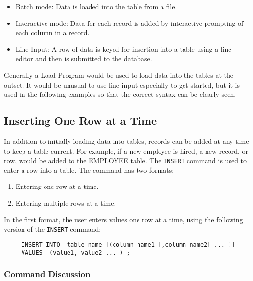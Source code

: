 \begin{itemize}
\item Batch mode: Data is loaded into the table from a file.

\item Interactive mode: Data for each record is added by interactive
prompting of each column in a record.

\item Line Input:  A row of data is keyed for insertion into a table
using a line editor and then is submitted to the database.
\end{itemize}

Generally a Load Program would be used to load data into the tables at
the outset.  It would be unusual to use line input especially to get
started, but it is used in the following examples so that the correct
syntax can be clearly seen.

\subsection{Inserting One Row at a Time}

In addition to initially loading data into tables, records can be
added at any time to keep a table current.  For example, if a new
employee is hired, a new record, or row, would be added to the
EMPLOYEE table.  The \verb`INSERT` command is used to enter a row into a
table.  The command has two formats:

\begin{enumerate}
\item Entering one row at a time.
\item Entering multiple rows at a time.
\end{enumerate}

In the first format, the user enters values one row at a time, using
the following version of the \verb`INSERT` command:

\begin{verbatim}
     INSERT INTO  table-name [(column-name1 [,column-name2] ... )]
     VALUES  (value1, value2 ... ) ;
\end{verbatim}


\subsubsection{Command Discussion}


